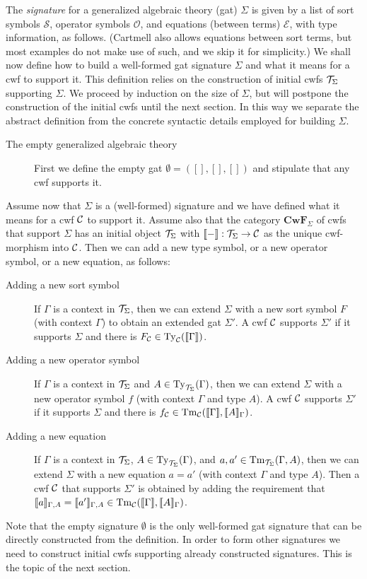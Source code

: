 \documentclass{lmcs}
\def\Sort{\mathcal{S}}
\def\Op{\mathcal{O}}
\def\Eq{\mathcal{E}}
\def\Cwf{\mathbf{CwF}}
\begin{document}
The {\em signature} for a generalized algebraic theory (gat) $\Sigma$  is given by a list of sort symbols $\Sort$, operator symbols $\Op$, and equations (between terms) $\Eq$, with type information, as follows. (Cartmell also allows equations between sort terms, but most examples do not make use of such, and we skip it for simplicity.) We shall now define how to build a well-formed gat signature $\Sigma$ and what it means for a cwf to support it. This definition relies on the construction of initial cwfs ${\mathcal T}_\Sigma$ supporting $\Sigma$. We proceed by induction on the size of $\Sigma$, but will postpone the construction of the initial cwfs until the next section. In this way we separate the abstract definition from the concrete syntactic details employed for building $\Sigma$.
\begin{description}
\item[The empty generalized algebraic theory] First we define the empty gat $\emptyset = ([],[],[])$ and stipulate that any cwf supports it. 
\end{description}
Assume now that $\Sigma$ is a (well-formed) signature and we have defined what it means for a cwf ${\mathcal C}$ to support it. Assume also that the category $\Cwf_\Sigma$ of cwfs that support $\Sigma$ has an initial object ${\mathcal T}_\Sigma$ with $\llbracket - \rrbracket : {\mathcal T}_\Sigma \to {\mathcal C}$ as the unique cwf-morphism into ${\mathcal C}$. Then we can add a new type symbol, or a new operator symbol, or a new equation, as follows:
\begin{description}
\item[Adding a new sort symbol] 
If $\Gamma$ is a context in ${\mathcal T}_\Sigma$, then we can extend $\Sigma$ with a new sort symbol $F$ (with context $\Gamma$) to obtain an extended gat $\Sigma'$. A cwf ${\mathcal C}$ supports $\Sigma'$ if it supports $\Sigma$ and there is $F_{\mathcal C} \in \mathrm{Ty}_{\mathcal C}(\llbracket \Gamma \rrbracket)$.
\item[Adding a new operator symbol] 
If $\Gamma$ is a context in ${\mathcal T}_\Sigma$ and $A \in \mathrm{Ty}_{{\mathcal T}_\Sigma}(\Gamma)$, then we can extend $\Sigma$ with a new operator symbol $f$ (with context $\Gamma$ and type $A$). A cwf ${\mathcal C}$ supports $\Sigma'$ if it supports $\Sigma$ and there is $f_{\mathcal C} \in\mathrm{Tm}_{\mathcal C}(\llbracket \Gamma \rrbracket,\llbracket A \rrbracket_{\Gamma})$.
\item[Adding a new equation] 
If $\Gamma$ is a context in ${\mathcal T}_\Sigma$, $A \in \mathrm{Ty}_{{\mathcal T}_\Sigma}(\Gamma)$, and $a, a' \in \mathrm{Tm}_{{\mathcal T}_\Sigma}(\Gamma,A)$, then we can extend $\Sigma$ with a new equation $a = a'$ (with context $\Gamma$ and type $A$). Then a cwf ${\mathcal C}$ that supports $\Sigma'$ is obtained by adding the requirement that $\llbracket a \rrbracket_{\Gamma,A}= \llbracket a' \rrbracket_{\Gamma,A} \in \mathrm{Tm}_{\mathcal C}(\llbracket \Gamma \rrbracket,\llbracket A \rrbracket_\Gamma)$.
\end{description}
Note that the empty signature $\emptyset$ is the only well-formed gat signature that can be directly constructed from the definition. In order to form other signatures we need to construct initial cwfs supporting already constructed signatures. This is the topic of the next section.
\end{document}
